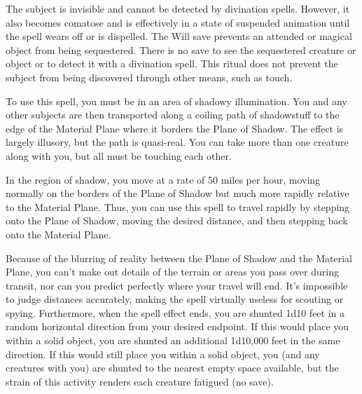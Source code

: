 \spelleffect The subject is invisible and cannot be detected by divination spells. However, it also becomes comatose and is effectively in a state of suspended animation until the spell wears off or is dispelled.
\spellnotes The Will save prevents an attended or magical object from being sequestered. There is no save to see the sequestered creature or object or to detect it with a divination spell. This ritual does not prevent the subject from being discovered through other means, such as touch.

\spelldur{\durext \dismissable}
\spelleffect To use this spell, you must be in an area of shadowy illumination. You and any other subjects are then transported along a coiling path of shadowstuff to the edge of the Material Plane where it borders the Plane of Shadow. The effect is largely illusory, but the path is quasi-real. You can take more than one creature along with you, but all must be touching each other.
\par In the region of shadow, you move at a rate of 50 miles per hour, moving normally on the borders of the Plane of Shadow but much more rapidly relative to the Material Plane. Thus, you can use this spell to travel rapidly by stepping onto the Plane of Shadow, moving the desired distance, and then stepping back onto the Material Plane.
\par Because of the blurring of reality between the Plane of Shadow and the Material Plane, you can't make out details of the terrain or areas you pass over during transit, nor can you predict perfectly where your travel will end. It's impossible to judge distances accurately, making the spell virtually useless for scouting or spying. Furthermore, when the spell effect ends, you are shunted 1d10 feet in a random horizontal direction from your desired endpoint. If this would place you within a solid object, you are shunted an additional 1d10,000 feet in the same direction. If this would still place you within a solid object, you (and any creatures with you) are shunted to the nearest empty space available, but the strain of this activity renders each creature fatigued (no save).

